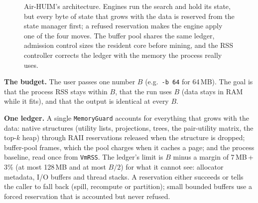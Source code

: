 \documentclass[conference]{IEEEtran}
\begin{document}
\begin{figure}[t]
{}
\caption{Air-HUIM's architecture. Engines run the search and hold its state, but every byte of state
that grows with the data is reserved from the state manager first; a refused reservation makes the
engine apply one of the four moves. The buffer pool shares the same ledger, admission control sizes
the resident core before mining, and the RSS controller corrects the ledger with the memory the
process really uses.}
\label{fig:arch}
\end{figure}

\textbf{The budget.} The user passes one number $B$ (e.g.\ \texttt{-b 64} for 64\,MB). The goal
is that the process RSS stays within $B$, that the run uses $B$ (data stays in RAM while it fits),
and that the output is identical at every $B$.

\textbf{One ledger.} A single \texttt{MemoryGuard} accounts for everything that grows with the data:
native structures (utility lists, projections, trees, the pair-utility matrix, the top-$k$ heap)
through RAII reservations released when the structure is dropped; buffer-pool frames, which the
pool charges when it caches a page; and the process baseline, read once from \texttt{VmRSS}. The
ledger's limit is $B$ minus a margin of 7\,MB\,+\,3\% (at most 128\,MB and at most $B/2$) for what it
cannot see: allocator metadata, I/O buffers and thread stacks. A reservation either succeeds or
tells the caller to fall back (spill, recompute or partition); small bounded buffers use a forced
reservation that is accounted but never refused.
\end{document}
